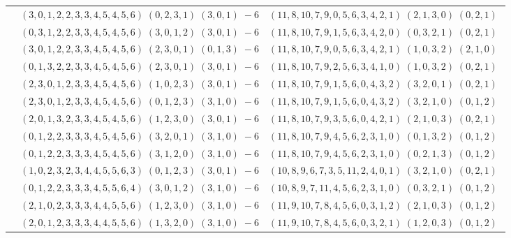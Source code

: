 \documentclass[11pt]{article}
\begin{document}
\begin{longtable}[l]{|c|c|c|}
 \cline{2-3} 
 & $(3 ,0 ,1 ,2 ,2 ,3 ,3 ,4 ,5 ,4 ,5 ,6) \;(0 ,2 ,3 ,1) \;(3 ,0 ,1) \;-6$ & $(11 ,8 ,10 ,7 ,9 ,0 ,5 ,6 ,3 ,4 ,2 ,1) \;(2 ,1 ,3 ,0) \;(0 ,2 ,1) \;$\\ 
 \cline{2-3} 
 & $(0 ,3 ,1 ,2 ,2 ,3 ,3 ,4 ,5 ,4 ,5 ,6) \;(3 ,0 ,1 ,2) \;(3 ,0 ,1) \;-6$ & $(11 ,8 ,10 ,7 ,9 ,1 ,5 ,6 ,3 ,4 ,2 ,0) \;(0 ,3 ,2 ,1) \;(0 ,2 ,1) \;$\\ 
 \cline{2-3} 
 & $(3 ,0 ,1 ,2 ,2 ,3 ,3 ,4 ,5 ,4 ,5 ,6) \;(2 ,3 ,0 ,1) \;(0 ,1 ,3) \;-6$ & $(11 ,8 ,10 ,7 ,9 ,0 ,5 ,6 ,3 ,4 ,2 ,1) \;(1 ,0 ,3 ,2) \;(2 ,1 ,0) \;$\\ 
 \cline{2-3} 
 & $(0 ,1 ,3 ,2 ,2 ,3 ,3 ,4 ,5 ,4 ,5 ,6) \;(2 ,3 ,0 ,1) \;(3 ,0 ,1) \;-6$ & $(11 ,8 ,10 ,7 ,9 ,2 ,5 ,6 ,3 ,4 ,1 ,0) \;(1 ,0 ,3 ,2) \;(0 ,2 ,1) \;$\\ 
 \cline{2-3} 
 & $(2 ,3 ,0 ,1 ,2 ,3 ,3 ,4 ,5 ,4 ,5 ,6) \;(1 ,0 ,2 ,3) \;(3 ,0 ,1) \;-6$ & $(11 ,8 ,10 ,7 ,9 ,1 ,5 ,6 ,0 ,4 ,3 ,2) \;(3 ,2 ,0 ,1) \;(0 ,2 ,1) \;$\\ 
 \cline{2-3} 
 & $(2 ,3 ,0 ,1 ,2 ,3 ,3 ,4 ,5 ,4 ,5 ,6) \;(0 ,1 ,2 ,3) \;(3 ,1 ,0) \;-6$ & $(11 ,8 ,10 ,7 ,9 ,1 ,5 ,6 ,0 ,4 ,3 ,2) \;(3 ,2 ,1 ,0) \;(0 ,1 ,2) \;$\\ 
 \cline{2-3} 
 & $(2 ,0 ,1 ,3 ,2 ,3 ,3 ,4 ,5 ,4 ,5 ,6) \;(1 ,2 ,3 ,0) \;(3 ,0 ,1) \;-6$ & $(11 ,8 ,10 ,7 ,9 ,3 ,5 ,6 ,0 ,4 ,2 ,1) \;(2 ,1 ,0 ,3) \;(0 ,2 ,1) \;$\\ 
 \cline{2-3} 
 & $(0 ,1 ,2 ,2 ,3 ,3 ,3 ,4 ,5 ,4 ,5 ,6) \;(3 ,2 ,0 ,1) \;(3 ,1 ,0) \;-6$ & $(11 ,8 ,10 ,7 ,9 ,4 ,5 ,6 ,2 ,3 ,1 ,0) \;(0 ,1 ,3 ,2) \;(0 ,1 ,2) \;$\\ 
 \cline{2-3} 
 & $(0 ,1 ,2 ,2 ,3 ,3 ,3 ,4 ,5 ,4 ,5 ,6) \;(3 ,1 ,2 ,0) \;(3 ,1 ,0) \;-6$ & $(11 ,8 ,10 ,7 ,9 ,4 ,5 ,6 ,2 ,3 ,1 ,0) \;(0 ,2 ,1 ,3) \;(0 ,1 ,2) \;$\\ 
 \cline{2-3} 
 & $(1 ,0 ,2 ,3 ,2 ,3 ,4 ,4 ,5 ,5 ,6 ,3) \;(0 ,1 ,2 ,3) \;(3 ,0 ,1) \;-6$ & $(10 ,8 ,9 ,6 ,7 ,3 ,5 ,11 ,2 ,4 ,0 ,1) \;(3 ,2 ,1 ,0) \;(0 ,2 ,1) \;$\\ 
 \cline{2-3} 
 & $(0 ,1 ,2 ,2 ,3 ,3 ,3 ,4 ,5 ,5 ,6 ,4) \;(3 ,0 ,1 ,2) \;(3 ,1 ,0) \;-6$ & $(10 ,8 ,9 ,7 ,11 ,4 ,5 ,6 ,2 ,3 ,1 ,0) \;(0 ,3 ,2 ,1) \;(0 ,1 ,2) \;$\\ 
 \cline{2-3} 
 & $(2 ,1 ,0 ,2 ,3 ,3 ,3 ,4 ,4 ,5 ,5 ,6) \;(1 ,2 ,3 ,0) \;(3 ,1 ,0) \;-6$ & $(11 ,9 ,10 ,7 ,8 ,4 ,5 ,6 ,0 ,3 ,1 ,2) \;(2 ,1 ,0 ,3) \;(0 ,1 ,2) \;$\\ 
 \cline{2-3} 
 & $(2 ,0 ,1 ,2 ,3 ,3 ,3 ,4 ,4 ,5 ,5 ,6) \;(1 ,3 ,2 ,0) \;(3 ,1 ,0) \;-6$ & $(11 ,9 ,10 ,7 ,8 ,4 ,5 ,6 ,0 ,3 ,2 ,1) \;(1 ,2 ,0 ,3) \;(0 ,1 ,2) \;$\\ 

\end{longtable}
\end{document}
